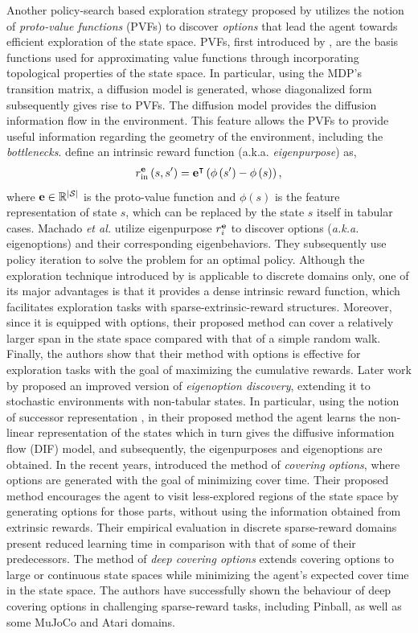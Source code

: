 Another policy-search based exploration strategy proposed by  utilizes the notion of \emph{proto-value functions} (PVFs) to discover \emph{options} that lead the agent towards efficient exploration of the state space. PVFs, first introduced by , are the basis functions used for approximating value functions through incorporating topological properties of the state space. In particular, using the MDP's transition matrix, a diffusion model is generated, whose diagonalized form subsequently gives rise to PVFs. The diffusion model provides the diffusion information flow in the environment. This feature allows the PVFs to provide useful information regarding the geometry of the environment, including the \emph{bottlenecks}.  define an intrinsic reward function (a.k.a. \emph{eigenpurpose}) as,
\begin{align}
r^{\textbf e}_{\mbox{\scriptsize in}}\left(s,s^\prime\right) = {\textbf e}^{\intercal}\left(\phi\left(s^\prime\right)-\phi\left(s\right)\right),\label{eq:eigenpurpose}
\end{align}
where ${\textbf e}\in\mathbb{R}^{|\mathcal{S}|}$ is the proto-value function and $\phi(s)$ is the feature representation of state $s$, which can be replaced by the state $s$ itself in tabular cases. Machado \emph{et al.} utilize eigenpurpose $r_i^{\textbf e}$ to discover options (\emph{a.k.a.} eigenoptions) and their corresponding eigenbehaviors. They subsequently use policy iteration to solve the problem for an optimal policy. 
Although the exploration technique introduced by  is applicable to discrete domains only, one of its major advantages is that it provides a dense intrinsic reward function, which facilitates exploration tasks with sparse-extrinsic-reward structures. Moreover, since it is equipped with options, their proposed method can cover a relatively larger span in the state space compared with that of a simple random walk. Finally, the authors show that their method with options is effective for exploration tasks with the goal of maximizing the cumulative rewards. Later work by  proposed an improved version of \emph{eigenoption discovery}, extending it to stochastic environments with non-tabular states. In particular, using the notion of successor representation , in their proposed method the agent learns the non-linear representation of the states which in turn gives the diffusive information flow (DIF) model, and subsequently, the eigenpurposes and eigenoptions are obtained. 
In the recent years,  introduced the method of \emph{covering options}, where options are generated with the goal of minimizing cover time. Their proposed method encourages the agent to visit less-explored regions of the state space by generating options for those parts, without using the information obtained from extrinsic rewards. Their empirical evaluation in discrete sparse-reward domains present reduced learning time in comparison with that of some of their predecessors. The method of \emph{deep covering options}  extends covering options to large or continuous state spaces while minimizing the agent's expected cover time in the state space. The authors have successfully shown the behaviour of deep covering options in challenging sparse-reward tasks, including Pinball, as well as some MuJoCo and Atari domains.
